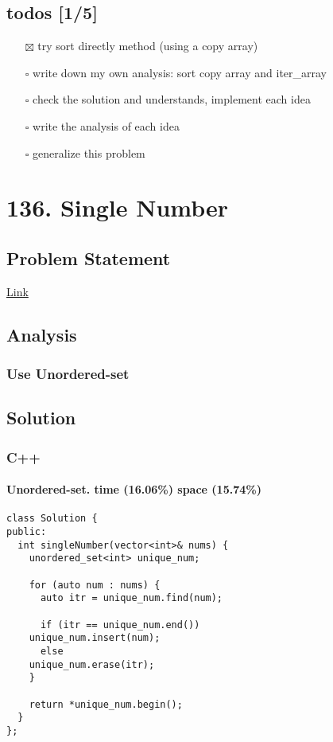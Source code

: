\documentclass[12pt]{book}
\begin{document}
\section{todos [1/5]}
\label{sec:orgee18b6f}
\begin{itemize}
\item[{$\boxtimes$}] try sort directly method (using a copy array)
\item[{$\square$}] write down my own analysis: sort copy array and iter\_array
\item[{$\square$}] check the solution and understands, implement each idea
\item[{$\square$}] write the analysis of each idea
\item[{$\square$}] generalize this problem
\end{itemize}
\chapter{136. Single Number}
\label{sec:orgbb5ed07}
\section{Problem Statement}
\label{sec:orgb05e321}
\href{https://leetcode.com/problems/single-number/}{Link
}
\section{Analysis}
\label{sec:orge2b03c6}
\subsection{Use Unordered-set}
\label{sec:orgb8a8d90}
\section{Solution}
\label{sec:org07f331f}
\subsection{C++}
\label{sec:org5e7e5f5}
\subsubsection{Unordered-set. time (16.06\%) space (15.74\%)}
\label{sec:orgcbf5c39}
\begin{verbatim}
class Solution {
public:
  int singleNumber(vector<int>& nums) {
    unordered_set<int> unique_num;

    for (auto num : nums) {
      auto itr = unique_num.find(num);

      if (itr == unique_num.end())
	unique_num.insert(num);
      else
	unique_num.erase(itr);
    }

    return *unique_num.begin();
  }
};
\end{verbatim}
\end{document}
